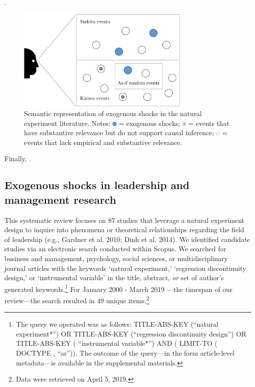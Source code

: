 \begin{refsection}
.

\begin{figure}[!htbp]
  \centering
  \includegraphics[width=0.75\textwidth]{exhibits/exogenous_shocks_and_ne.pdf}
  \caption{Semantic representation of exogenous shocks in the natural 
  experiment literature. Notes:  
  \includegraphics[width=0.0175\textwidth]{exhibits/exogenous_shocks_and_ne_0.pdf}
  = exogenous shocks;
  \includegraphics[width=0.0175\textwidth]{exhibits/exogenous_shocks_and_ne_1.pdf}
  = events that have substantive relevance but do not support causal inference;
  \includegraphics[width=0.0175\textwidth]{exhibits/exogenous_shocks_and_ne_2.pdf}
  = events that lack empirical and substantive relevance.}
  \label{fig:exogeneous_shocks_and_ne}
\end{figure}


Finally, .

\subsection{Exogenous shocks in leadership and management research}
\label{subsec:exogenous_shocks_in_management}

\noindent This systematic review focuses on 87 studies that leverage a natural
experiment design to inquire into phenomena or theoretical relationships
regarding the field of leadership (e.g., Gardner et al. 2010; Dinh et al. 2014).
We identified candidate studies via an electronic search conducted within
Scopus. We searched for business and management, psychology, social sciences, or
multidisciplinary journal articles with the keywords `natural experiment,'
`regression discontinuity design,' or `instrumental variable' in the title,
abstract, \emph{or} set of author's generated keywords.\footnote{The query we
	operated was as follows: TITLE-ABS-KEY (``natural experiment*'') OR
	TITLE-ABS-KEY (``regression discontinuity design'') OR TITLE-ABS-KEY (
``instrumental variable*'') AND ( LIMIT-TO ( DOCTYPE , ``ar'')). The outcome of
the query---in the form article-level metadata---is available in the
supplemental materials.} For January 2000 - March 2019 ---the timespan of our
review---the search resulted in 49 unique items.\footnote{Data were retrieved
	on April 5, 2019.}


\end{refsection}
